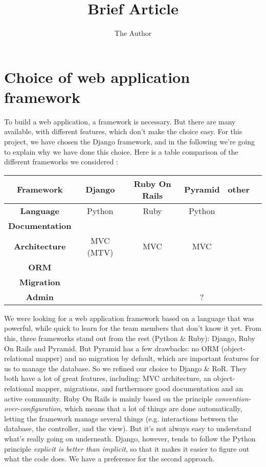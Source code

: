 \documentclass[11pt, a4paper]{article}   	%
\title{Brief Article}
\author{The Author}
\newcommand{\tbf}[1]{\textbf{#1}}
\newcommand{\tit}[1]{\textit{#1}}
\newcommand{\yes}{\color{green}{\ding{52}}}
\newcommand{\no}{\color{red}{\ding{56}}}
\begin{document}

\section{Choice of web application framework}

To build a web application, a framework is necessary.
But there are many available, with different features, which don't make the choice easy.
For this project, we have chosen the Django framework, and in the following we're going to explain why we have done this choice.
Here is a table comparison of the different frameworks we considered :

\bigskip
\begin{tabular}{|c|c|c|c|c|c|}
\hline
\tbf{Framework}		& Django		& Ruby On Rails	& Pyramid	&	other	\\
\hline
\tbf{Language}		& Python		& Ruby			& Python	&	\\
\hline
\tbf{Documentation}	& \yes			& \yes			& \yes		&	\\
\hline
\tbf{Architecture}		& MVC (MTV)	& MVC			& MVC		&	\\
\hline
\tbf{ORM}			& \yes			& \yes			& \no		&	\\
\hline
\tbf{Migration} 		& \yes			& \yes			& \no		&	\\
\hline
\tbf{Admin}			& \yes			& \no			& ?			&	\\
\hline
\end{tabular}


\bigskip
We were looking for a web application framework based on a language that was powerful, while quick to learn for the team members that don't know it yet.
From this, three frameworks stand out from the rest (Python \& Ruby): Django, Ruby On Rails and Pyramid.
But Pyramid has a few drawbacks: no ORM (object-relational mapper) and no migration by default, which are important features for us to manage the database.
So we refined our choice to Django \& RoR.
They both have a lot of great features, including: MVC architecture, an object-relational mapper, migrations, and furthermore good documentation and an active community.
Ruby On Rails is mainly based on the principle \tit{convention-over-configuration}, which means that a lot of things are done automatically, letting the framework manage several things (e.g. interactions between the database, the controller, and the view). But it's not always easy to understand what's really going on underneath.
Django, however, tends to follow the Python principle \tit{explicit is better than implicit}, so that it makes it easier to figure out what the code does.
We have a preference for the second approach.
\end{document}
